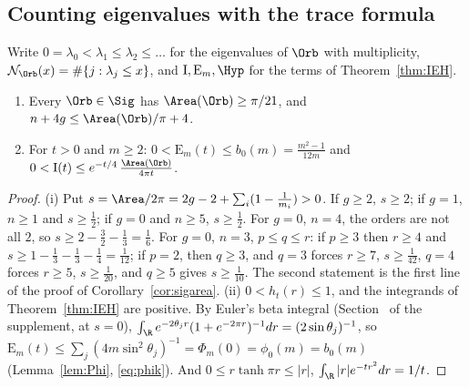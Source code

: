 
\subsection{Counting eigenvalues with the trace formula}\label{sec:eig-count}

Write $0=\lambda_0<\lambda_1\le\lambda_2\le\dots$ for the eigenvalues of $\Orb$ with multiplicity, $\mathcal N_\Orb(x)=\#\{j:\lambda_j\le x\}$, and $\mathrm I,\mathrm E_m,\Hyp$ for the terms of Theorem~\ref{thm:IEH}.

\begin{lemma}\label{eig:elem}
\leavevmode
\begin{enumerate}[label=(\roman*)]
\item Every $\Orb\in\Sig$ has $\Area(\Orb)\ge\pi/21$, and $n+4g\le\Area(\Orb)/\pi+4$.
\item For $t>0$ and $m\ge2$: $0<\mathrm E_m(t)\le b_0(m)=\frac{m^2-1}{12m}$ and $0<\mathrm I(t)\le e^{-t/4}\,\frac{\Area(\Orb)}{4\pi t}$.
\end{enumerate}
\end{lemma}

\begin{proof}
(i) Put $s=\Area/2\pi=2g-2+\sum_i(1-\frac1{m_i})>0$. If $g\ge2$, $s\ge2$; if $g=1$, $n\ge1$ and $s\ge\frac12$; if $g=0$ and $n\ge5$, $s\ge\frac12$. For $g=0$, $n=4$, the orders are not all $2$, so $s\ge2-\frac32-\frac13=\frac16$. For $g=0$, $n=3$, $p\le q\le r$: if $p\ge3$ then $r\ge4$ and $s\ge1-\frac13-\frac13-\frac14=\frac1{12}$; if $p=2$, then $q\ge3$, and $q=3$ forces $r\ge7$, $s\ge\frac1{42}$, $q=4$ forces $r\ge5$, $s\ge\frac1{20}$, and $q\ge5$ gives $s\ge\frac1{10}$. The second statement is the first line of the proof of Corollary~\ref{cor:sigarea}.
(ii) $0<h_t(r)\le1$, and the integrands of Theorem~\ref{thm:IEH} are positive. By Euler's beta integral (Section~ of the supplement, at $s=0$), $\int_\R e^{-2\theta_jr}(1+e^{-2\pi r})^{-1}dr=(2\sin\theta_j)^{-1}$, so $\mathrm E_m(t)\le\sum_j(4m\sin^2\theta_j)^{-1}=\Phi_m(0)=\phi_0(m)=b_0(m)$ (Lemma~\ref{lem:Phi}, \eqref{eq:phik}). And $0\le r\tanh\pi r\le|r|$, $\int_\R|r|e^{-tr^2}dr=1/t$.
\end{proof}

